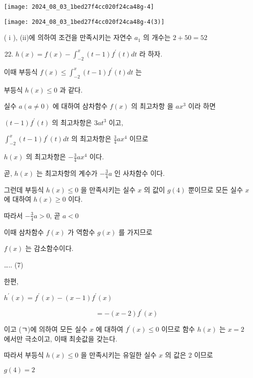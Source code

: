 \documentclass[10pt]{article}
\begin{document}
\begin{center}
\texttt{[image: 2024\_08\_03\_1bed27f4cc020f24ca48g-4]}
\end{center}

\begin{center}
\texttt{[image: 2024\_08\_03\_1bed27f4cc020f24ca48g-4(3)]}
\end{center}

( i ), (ii)에 의하여 조건을 만족시키는 자연수 \(a_{1}\) 의 개수는 \(2+50=52\)

\begin{enumerate}
  \setcounter{enumi}{21}
  \item \(h(x)=f(x)-\int_{-2}^{x}(t-1) f^{\prime}(t) d t\) 라 하자.
\end{enumerate}

이때 부등식 \(f(x) \leq \int_{-2}^{x}(t-1) f^{\prime}(t) d t\) 는

부등식 \(h(x) \leq 0\) 과 같다.

실수 \(a(a \neq 0)\) 에 대하여 삼차함수 \(f(x)\) 의 최고차항 을 \(a x^{3}\) 이라 하면

\((t-1) f^{\prime}(t)\) 의 최고차항은 \(3 a t^{3}\) 이고,

\(\int_{-2}^{x}(t-1) f^{\prime}(t) d t\) 의 최고차항은 \(\frac{3}{4} a x^{4}\) 이므로

\(h(x)\) 의 최고차항은 \(-\frac{3}{4} a x^{4}\) 이다.

곧, \(h(x)\) 는 최고차항의 계수가 \(-\frac{3}{4} a\) 인 사차함수 이다.

그런데 부등식 \(h(x) \leq 0\) 을 만족시키는 실수 \(x\) 의 값이 \(g(4)\) 뿐이므로 모든 실수 \(x\) 에 대하여 \(h(x) \geq 0\) 이다.

따라서 \(-\frac{3}{4} a>0\), 곧 \(a<0\)

이때 삼차함수 \(f(x)\) 가 역함수 \(g(x)\) 를 가지므로

\(f(x)\) 는 감소함수이다.

….. (7)

한편,

\(h^{\prime}(x)=f^{\prime}(x)-(x-1) f^{\prime}(x)\)

\[
=-(x-2) f^{\prime}(x)
\]

이고 (ㄱ)에 의하여 모든 실수 \(x\) 에 대하여 \(f^{\prime}(x) \leq 0\) 이므로 함수 \(h(x)\) 는 \(x=2\) 에서만 극소이고, 이때 최솟값을 갖는다.

따라서 부등식 \(h(x) \leq 0\) 을 만족시키는 유일한 실수 \(x\) 의 값은 2 이므로

\(g(4)=2\)
\end{document}
